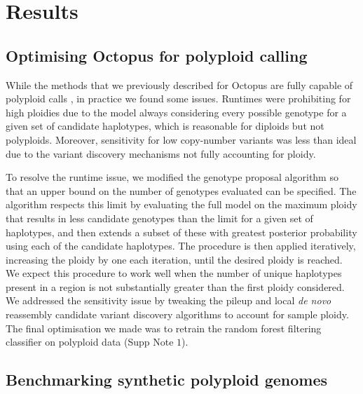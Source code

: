 \documentclass[notitlepage, twocolumn, 10pt]{article}
\begin{document}
\section*{Results}

\subsection*{Optimising Octopus for polyploid calling}

While the methods that we previously described for Octopus are fully capable of polyploid calls \cite{RN663}, in practice we found some issues. Runtimes were prohibiting for high ploidies due to the model always considering every possible genotype for a given set of candidate haplotypes, which is reasonable for diploids but not polyploids. Moreover, sensitivity for low copy-number variants was less than ideal due to the variant discovery mechanisms not fully accounting for ploidy.

To resolve the runtime issue, we modified the genotype proposal algorithm so that an upper bound on the number of genotypes evaluated can be specified. The algorithm respects this limit by evaluating the full model on the maximum ploidy that results in less candidate genotypes than the limit for a given set of haplotypes, and then extends a subset of these with greatest posterior probability using each of the candidate haplotypes. The procedure is then applied iteratively, increasing the ploidy by one each iteration, until the desired ploidy is reached. We expect this procedure to work well when the number of unique haplotypes present in a region is not substantially greater than the first ploidy considered. We addressed the sensitivity issue by tweaking the pileup and local \emph{de novo} reassembly candidate variant discovery algorithms to account for sample ploidy. The final optimisation we made was to retrain the random forest filtering classifier on polyploid data (Supp Note $1$).

\subsection*{Benchmarking synthetic polyploid genomes}
\end{document}
